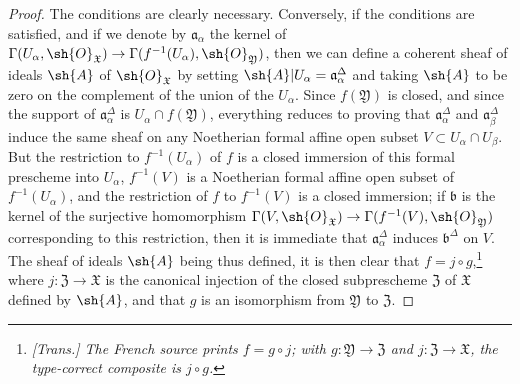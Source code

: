 \begin{proof}
The conditions are clearly necessary.
Conversely, if the conditions are satisfied, and if we denote by $\mathfrak{a}_\alpha$ the kernel of $\Gamma(U_\alpha,\sh{O}_\mathfrak{X})\to\Gamma(f^{-1}(U_\alpha),\sh{O}_\mathfrak{Y})$, then we can define a coherent sheaf of ideals $\sh{A}$ of $\sh{O}_\mathfrak{X}$ by setting $\sh{A}|U_\alpha=\mathfrak{a}_\alpha^\Delta$ and taking $\sh{A}$ to be zero on the complement of the union of the $U_\alpha$.
Since $f(\mathfrak{Y})$ is closed, and since the support of $\mathfrak{a}_\alpha^\Delta$ is $U_\alpha\cap f(\mathfrak{Y})$, everything reduces to proving that $\mathfrak{a}_\alpha^\Delta$ and $\mathfrak{a}_\beta^\Delta$ induce the same sheaf on any Noetherian formal affine open subset $V\subset U_\alpha\cap U_\beta$.
But the restriction to $f^{-1}(U_\alpha)$ of $f$ is a closed immersion of this formal prescheme into $U_\alpha$, $f^{-1}(V)$ is a Noetherian formal affine open subset of $f^{-1}(U_\alpha)$, and the restriction of $f$ to $f^{-1}(V)$ is a closed immersion;
if $\mathfrak{b}$ is the kernel of the surjective homomorphism $\Gamma(V,\sh{O}_\mathfrak{X})\to\Gamma(f^{-1}(V),\sh{O}_\mathfrak{Y})$ corresponding to this restriction, then it is immediate  that $\mathfrak{a}_\alpha^\Delta$ induces $\mathfrak{b}^\Delta$ on $V$.
The sheaf of ideals $\sh{A}$ being thus defined, it is then clear that $f=j\circ g$,\footnote{\emph{[Trans.] The French source prints $f=g\circ j$; with $g:\mathfrak{Y}\to\mathfrak{Z}$ and $j:\mathfrak{Z}\to\mathfrak{X}$, the type-correct composite is $j\circ g$.}} where $j:\mathfrak{Z}\to\mathfrak{X}$ is the canonical injection of the closed subprescheme $\mathfrak{Z}$ of $\mathfrak{X}$ defined by $\sh{A}$, and that $g$ is an isomorphism from $\mathfrak{Y}$ to $\mathfrak{Z}$.
\end{proof}


